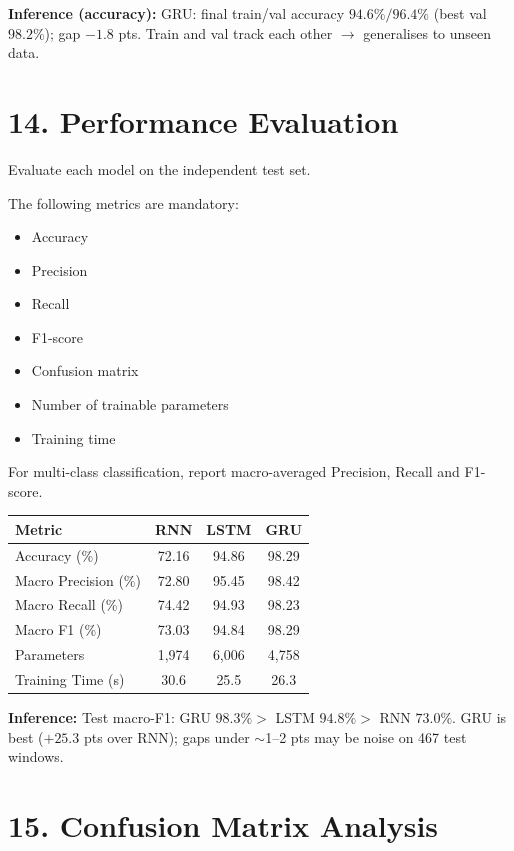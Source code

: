 \documentclass[10pt]{article}
\begin{document}
\textbf{Inference (accuracy):} GRU: final train/val accuracy $94.6\%/96.4\%$
(best val $98.2\%$); gap $-1.8$ pts. Train and val track each other
$\rightarrow$ generalises to unseen data.

\section*{14. Performance Evaluation}

Evaluate each model on the independent test set.

The following metrics are mandatory:

\begin{itemize}
\item Accuracy
\item Precision
\item Recall
\item F1-score
\item Confusion matrix
\item Number of trainable parameters
\item Training time
\end{itemize}

For multi-class classification, report macro-averaged Precision, Recall and
F1-score.

\begin{center}
\begin{tabular}{|l|c|c|c|}
\hline
Metric & RNN & LSTM & GRU\\
\hline
Accuracy (\%) & 72.16 & 94.86 & 98.29\\
Macro Precision (\%) & 72.80 & 95.45 & 98.42\\
Macro Recall (\%) & 74.42 & 94.93 & 98.23\\
Macro F1 (\%) & 73.03 & 94.84 & 98.29\\
Parameters & 1,974 & 6,006 & 4,758\\
Training Time (s) & 30.6 & 25.5 & 26.3\\
\hline
\end{tabular}
\end{center}

\textbf{Inference:} Test macro-F1: GRU $98.3\%>$ LSTM $94.8\%>$ RNN
$73.0\%$. GRU is best ($+25.3$ pts over RNN); gaps under $\sim$1--2 pts may
be noise on 467 test windows.

\section*{15. Confusion Matrix Analysis}
\end{document}
